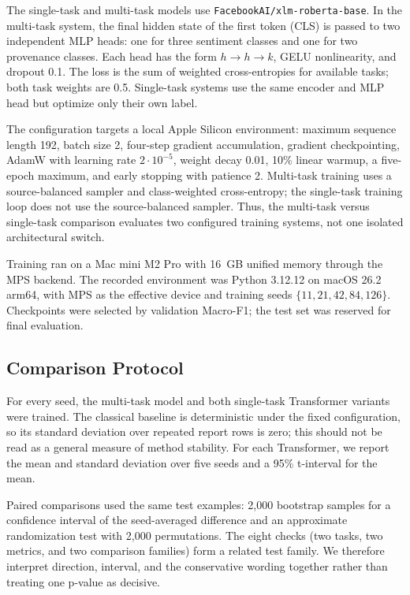 \documentclass[11pt,a4paper]{article}
\newcommand{\repo}[1]{\nolinkurl{#1}}
\begin{document}
The single-task and multi-task models use \repo{FacebookAI/xlm-roberta-base}. In the multi-task system, the final hidden state of the first token (CLS) is passed to two independent MLP heads: one for three sentiment classes and one for two provenance classes. Each head has the form $h\rightarrow h\rightarrow k$, GELU nonlinearity, and dropout 0.1. The loss is the sum of weighted cross-entropies for available tasks; both task weights are 0.5. Single-task systems use the same encoder and MLP head but optimize only their own label.

The configuration targets a local Apple Silicon environment: maximum sequence length 192, batch size 2, four-step gradient accumulation, gradient checkpointing, AdamW with learning rate $2\cdot10^{-5}$, weight decay 0.01, 10\% linear warmup, a five-epoch maximum, and early stopping with patience 2. Multi-task training uses a source-balanced sampler and class-weighted cross-entropy; the single-task training loop does not use the source-balanced sampler. Thus, the multi-task versus single-task comparison evaluates two configured training systems, not one isolated architectural switch.

Training ran on a Mac mini M2 Pro with 16~GB unified memory through the MPS backend. The recorded environment was Python 3.12.12 on macOS 26.2 arm64, with MPS as the effective device and training seeds $\{11,21,42,84,126\}$. Checkpoints were selected by validation Macro-F1; the test set was reserved for final evaluation.

\subsection{Comparison Protocol}

For every seed, the multi-task model and both single-task Transformer variants were trained. The classical baseline is deterministic under the fixed configuration, so its standard deviation over repeated report rows is zero; this should not be read as a general measure of method stability. For each Transformer, we report the mean and standard deviation over five seeds and a 95\% t-interval for the mean.

Paired comparisons used the same test examples: 2,000 bootstrap samples for a confidence interval of the seed-averaged difference and an approximate randomization test with 2,000 permutations. The eight checks (two tasks, two metrics, and two comparison families) form a related test family. We therefore interpret direction, interval, and the conservative wording together rather than treating one p-value as decisive.
\end{document}
